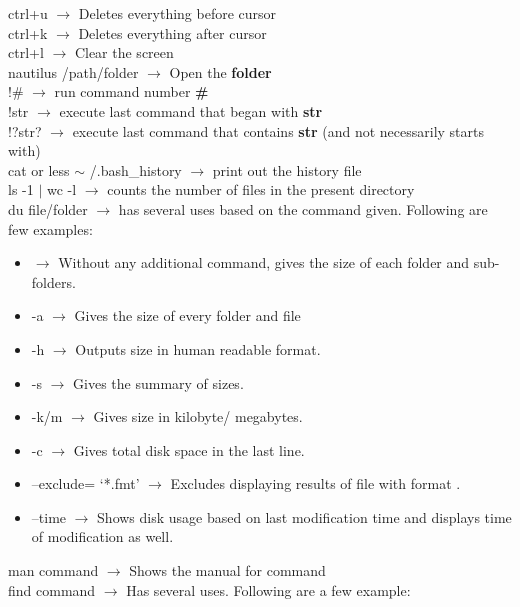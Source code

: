 \documentclass[twoside,a4paper]{article}
\newcommand{\tcb}{\color{blue}} \newcommand{\tcc}{\color{cyan}} \newcommand{\tcr}{\color{red}}
\newcommand{\tck}{\color{black}}
\newcommand{\ra }{$\rightarrow$ }
\newcommand{\hs}{\hspace}
\begin{document}
\begin{multicols}{2}
    \hs{-0.5 cm}\tcr  ctrl+u \tck  \ra Deletes everything before cursor\\
    \tcr  ctrl+k \tck  \ra Deletes everything after cursor\\
    \tcr  ctrl+l \tck  \ra Clear the screen\\
    \tcr   nautilus \tcb  /path/folder \tck  \ra Open the \textbf{folder}\\
    \tcr !\tcb \# \tck \ra run command number \textbf{\#}\\
    \tcr !\tcb str \tck \ra execute last command that began with \textbf{str}\\
    \tcr !\tcb ?str? \tck \ra execute last command that contains \textbf{str} (and not necessarily
    starts with)\\
    \tcr cat or less \tcb $\sim$ /.bash\_history \tck \ra print out the history file\\
    \tcr ls -1 $\mid$ wc -l \tck \ra counts the number of files in the present directory\\
    \tcr du \tcb {-command} \color{magenta} file/folder \tck \ra has several uses based on the \tcb
    {command} \tck given. Following are few examples:\\
    \begin{itemize}
        \item \tck \ra Without any additional command, gives the size of each folder and
              sub-folders.
        \item \tcb  -a \tck \ra Gives the size of every folder and file
        \item \tcb  -h \tck \ra Outputs size in human readable format.
        \item \tcb  -s \tck \ra Gives the summary of sizes.
        \item \tcb  -k/m \tck \ra Gives size in kilobyte/ megabytes.
        \item \tcb  -c \tck \ra Gives total disk space in the last line.
        \item \tcb  --exclude= \color{magenta}`*.fmt' \tck $\rightarrow$ Excludes displaying results
              of file with format \color{magenta}{fmt} \tck .
        \item \tcb  --time \tck \ra Shows disk usage based on last modification time and displays
              time of modification as well.
    \end{itemize}
    \tcr man \tcb  command \tck \ra Shows the manual for \tcr  \tcb  command\\
    \tcr  find \tcb  command \tck \ra Has several uses. Following are a few example:\\

\end{multicols}
\end{document}
